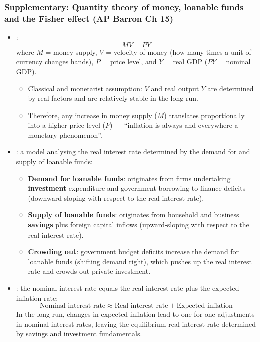 \subsubsection*{Supplementary: Quantity theory of money, loanable funds and the Fisher effect (AP Barron Ch 15)}
\begin{itemize}
  \item {}:
  \[MV = PY\]
  where $M$ = money supply, $V$ = velocity of money (how many times a unit of currency changes hands), $P$ = price level, and $Y$ = real GDP ($PY$ = nominal GDP).
  \begin{itemize}
    \item Classical and monetarist assumption: $V$ and real output $Y$ are determined by real factors and are relatively stable in the long run.
    \item Therefore, any increase in money supply ($M$) translates proportionally into a higher price level ($P$) --- ``inflation is always and everywhere a monetary phenomenon''.
  \end{itemize}
  \item {}: a model analysing the real interest rate determined by the demand for and supply of loanable funds:
  \begin{itemize}
    \item \textbf{Demand for loanable funds}: originates from firms undertaking \textbf{investment} expenditure and government borrowing to finance deficits (downward-sloping with respect to the real interest rate).
    \item \textbf{Supply of loanable funds}: originates from household and business \textbf{savings} plus foreign capital inflows (upward-sloping with respect to the real interest rate).
    \item \textbf{Crowding out}: government budget deficits increase the demand for loanable funds (shifting demand right), which pushes up the real interest rate and crowds out private investment.
  \end{itemize}
  \item {}: the nominal interest rate equals the real interest rate plus the expected inflation rate:
  \[\text{Nominal interest rate} \approx \text{Real interest rate} + \text{Expected inflation}\]
  In the long run, changes in expected inflation lead to one-for-one adjustments in nominal interest rates, leaving the equilibrium real interest rate determined by savings and investment fundamentals.
\end{itemize}

